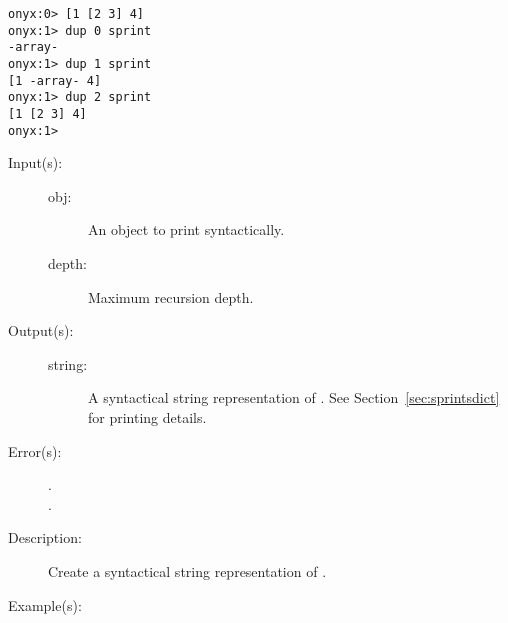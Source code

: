 \begin{description}
\begin{description}
\begin{verbatim}
onyx:0> [1 [2 3] 4]
onyx:1> dup 0 sprint
-array-
onyx:1> dup 1 sprint
[1 -array- 4]
onyx:1> dup 2 sprint
[1 [2 3] 4]
onyx:1>
		\end{verbatim}
	\end{description}
\label{systemdict:sprints}
\item[{\onyxop{obj depth}{sprints}{string}}: ]
	\begin{description}\item[]
	\item[Input(s): ]
		\begin{description}\item[]
		\item[obj: ]
			An object to print syntactically.
		\item[depth: ]
			Maximum recursion depth.
		\end{description}
	\item[Output(s): ]
		\begin{description}\item[]
		\item[string: ]
			A syntactical string representation of .
			See Section~\ref{sec:sprintsdict} for printing details.
		\end{description}
	\item[Error(s): ]
		\begin{description}\item[]
		\item[.]
		\item[.]
		\end{description}
	\item[Description: ]
		Create a syntactical string representation of .
	\item[Example(s): ]\begin{verbatim}


\end{verbatim}
\end{description}
\end{description}
